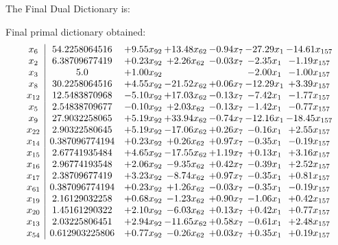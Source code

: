 \documentclass[8pt]{article}
\begin{document}
The Final Dual Dictionary is: 

 Final primal dictionary obtained: 
\[\begin{array}{c| c c@{\hskip 2pt} c@{\hskip 2pt} c@{\hskip 2pt} c@{\hskip 2pt} c@{\hskip 2pt} }
 x_{6}   &  54.2258064516 & +  9.55 x_{92} & + 13.48 x_{62} & -0.94 x_{7} & -27.29 x_{1} & -14.61 x_{157}\\
 x_{2}   &  6.38709677419 & +  0.23 x_{92} & +  2.26 x_{62} & -0.03 x_{7} & -2.35 x_{1} & -1.19 x_{157}\\
 x_{3}   &  5.0 & +  1.00 x_{92} &    &   & -2.00 x_{1} & -1.00 x_{157}\\
 x_{8}   &  30.2258064516 & +  4.55 x_{92} & -21.52 x_{62} & +  0.06 x_{7} & -12.29 x_{1} & +  3.39 x_{157}\\
 x_{12}   &  12.5483870968 & -5.10 x_{92} & + 17.03 x_{62} & -0.13 x_{7} & -7.42 x_{1} & -1.77 x_{157}\\
 x_{5}   &  2.54838709677 & -0.10 x_{92} & +  2.03 x_{62} & -0.13 x_{7} & -1.42 x_{1} & -0.77 x_{157}\\
 x_{9}   &  27.9032258065 & +  5.19 x_{92} & + 33.94 x_{62} & -0.74 x_{7} & -12.16 x_{1} & -18.45 x_{157}\\
 x_{22}   &  2.90322580645 & +  5.19 x_{92} & -17.06 x_{62} & +  0.26 x_{7} & -0.16 x_{1} & +  2.55 x_{157}\\
 x_{14}   &  0.387096774194 & +  0.23 x_{92} & +  0.26 x_{62} & +  0.97 x_{7} & -0.35 x_{1} & -0.19 x_{157}\\
 x_{15}   &  2.67741935484 & +  4.65 x_{92} & -17.55 x_{62} & +  1.19 x_{7} & +  0.13 x_{1} & +  3.16 x_{157}\\
 x_{16}   &  2.96774193548 & +  2.06 x_{92} & -9.35 x_{62} & +  0.42 x_{7} & -0.39 x_{1} & +  2.52 x_{157}\\
 x_{17}   &  2.38709677419 & +  3.23 x_{92} & -8.74 x_{62} & +  0.97 x_{7} & -0.35 x_{1} & +  0.81 x_{157}\\
 x_{61}   &  0.387096774194 & +  0.23 x_{92} & +  1.26 x_{62} & -0.03 x_{7} & -0.35 x_{1} & -0.19 x_{157}\\
 x_{19}   &  2.16129032258 & +  0.68 x_{92} & -1.23 x_{62} & +  0.90 x_{7} & -1.06 x_{1} & +  0.42 x_{157}\\
 x_{20}   &  1.45161290322 & +  2.10 x_{92} & -6.03 x_{62} & +  0.13 x_{7} & +  0.42 x_{1} & +  0.77 x_{157}\\
 x_{13}   &  2.03225806451 & +  2.94 x_{92} & -11.65 x_{62} & +  0.58 x_{7} & -0.61 x_{1} & +  2.48 x_{157}\\
 x_{54}   &  0.612903225806 & +  0.77 x_{92} & -0.26 x_{62} & +  0.03 x_{7} & +  0.35 x_{1} & +  0.19 x_{157}\\

\end{array}\]
\end{document}
